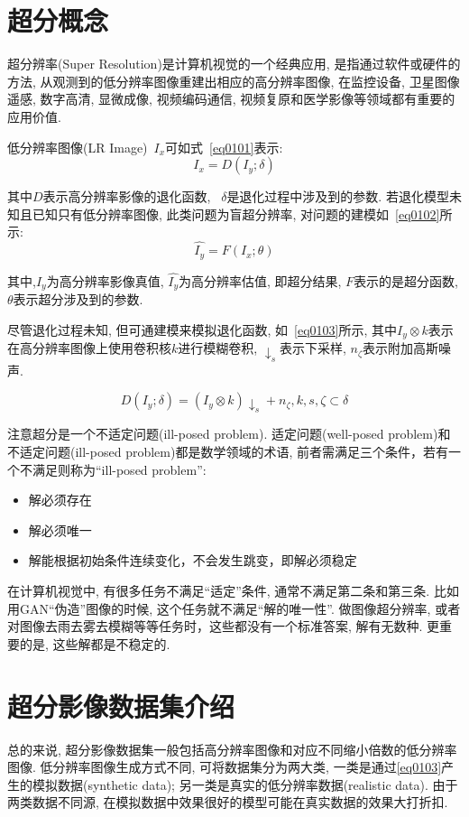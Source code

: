 \section{超分概念}
超分辨率(Super Resolution)是计算机视觉的一个经典应用, 是指通过软件或硬件的方法, 从观测到的低分辨率图像重建出相应的高分辨率图像, 在监控设备, 卫星图像遥感, 数字高清, 显微成像, 视频编码通信, 视频复原和医学影像等领域都有重要的应用价值. 

低分辨率图像(LR Image)~$I_{x}$可如式~\ref{eq0101}表示:
\begin{equation}
    I_{x}=D(I_{y};\delta)
    \label{eq0101}
\end{equation}

其中$D$表示高分辨率影像的退化函数, ~$\delta$是退化过程中涉及到的参数. 若退化模型未知且已知只有低分辨率图像, 此类问题为盲超分辨率, 对问题的建模如~\ref{eq0102}所示:
\begin{equation}
    \hat{I_{y}}=F(I_{x};\theta)
    \label{eq0102}
\end{equation}

其中,$I_{y}$为高分辨率影像真值, $\hat{I_{y}}$为高分辨率估值, 即超分结果, $F$表示的是超分函数, $\theta$表示超分涉及到的参数.

尽管退化过程未知, 但可通建模来模拟退化函数, 如~\ref{eq0103}所示, 其中$I_{y}\otimes k$表示在高分辨率图像上使用卷积核$k$进行模糊卷积, $\downarrow_{s}$表示下采样, $n_{\zeta}$表示附加高斯噪声.

\begin{equation}
    D(I_{y};\delta)=(I_{y}\otimes k)\downarrow_{s}+n_{\zeta}, {k, s, \zeta}\subset\delta 
    \label{eq0103}
\end{equation}

注意超分是一个不适定问题(ill-posed problem). 适定问题(well-posed problem)和不适定问题(ill-posed problem)都是数学领域的术语, 前者需满足三个条件，若有一个不满足则称为``ill-posed problem'':
\begin{itemize}
    \item 解必须存在
    \item 解必须唯一
    \item 解能根据初始条件连续变化，不会发生跳变，即解必须稳定
\end{itemize}

在计算机视觉中, 有很多任务不满足``适定''条件, 通常不满足第二条和第三条. 比如用GAN``伪造''图像的时候, 这个任务就不满足``解的唯一性''. 做图像超分辨率, 或者对图像去雨去雾去模糊等等任务时，这些都没有一个标准答案, 解有无数种. 更重要的是, 这些解都是不稳定的.

\section{超分影像数据集介绍}
总的来说, 超分影像数据集一般包括高分辨率图像和对应不同缩小倍数的低分辨率图像. 低分辨率图像生成方式不同, 可将数据集分为两大类, 一类是通过\ref{eq0103}产生的模拟数据(synthetic data); 另一类是真实的低分辨率数据(realistic data). 由于两类数据不同源, 在模拟数据中效果很好的模型可能在真实数据的效果大打折扣. 

